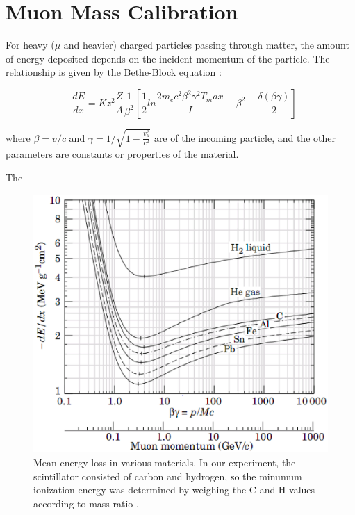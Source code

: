 
\section{Muon Mass Calibration}

For heavy ($\mu$ and heavier) charged particles passing through
matter, the amount of energy deposited depends on the incident
momentum of the particle. The relationship is given by the Bethe-Block
equation \cite{bichsel}:

\begin{equation}
-\frac{dE}{dx} = Kz^2\frac{Z}{A}\frac{1}{\beta^2}\left[\frac{1}{2}ln\frac{2m_ec^2\beta^2\gamma^2T_max}{I} - \beta^2 - \frac{\delta(\beta\gamma)}{2}\right]
\end{equation}

where $\beta = v/c$ and $\gamma = 1/\sqrt{1 - \frac{v_{\mu}^2}{c^2}}$
are of the incoming particle, and the other parameters are constants
or properties of the material.

The 

\begin{figure}[h]
\begin{center}
\includegraphics[width = 140mm]{figures/energy_loss.eps}
\caption{\small{Mean energy loss in various materials. In our
experiment, the scintillator consisted of carbon and hydrogen, so the
minumum ionization energy was determined by weighing the C and H
values according to mass ratio \cite{bichsel}.}}
\label{energy_loss}
\end{center}
\end{figure}
